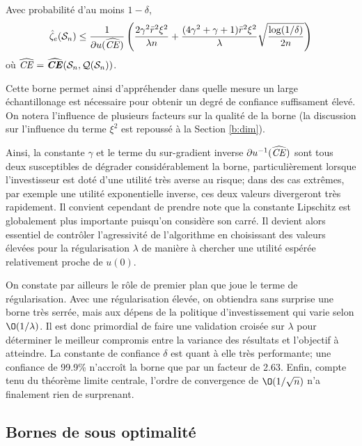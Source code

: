 \begin{thm}
  \label{thm2}
  Avec probabilité d'au moins $1-\delta$,
  \begin{equation}
    \hat\zeta_e(\mathcal S_n) \leq \frac{1}{\partial u(\operatorname{\widehat{\operatorname{\mbox{\textit{CE}}}}})}\left( \frac{2\gamma^2\bar r^2\xi^2}{\lambda n} + \frac{(4\gamma^2 + \gamma +
        1)\bar r^2\xi^2}{\lambda}\sqrt{\frac{\log(1/\delta)}{2n}}\right) 
  \end{equation}
  où $\operatorname{\widehat{\operatorname{\mbox{\textit{CE}}}}} = \operatorname{\widehat{\operatorname{\mbox{\textbf{\textit{CE}}}}}}(\mathcal S_n,\mathcal{Q}(\mathcal S_n))$. 
\end{thm}

Cette borne permet ainsi d'appréhender dans quelle mesure un large échantillonage est
nécessaire pour obtenir un degré de confiance suffisament élevé. On notera l'influence de
plusieurs facteurs sur la qualité de la borne (la discussion sur l'influence du terme
$\xi^2$ est repoussé à la Section \ref{b:dim}).

Ainsi, la constante $\gamma$ et le terme du sur-gradient inverse $\partial u^{-1}(\operatorname{\widehat{\operatorname{\mbox{\textit{CE}}}}})$ sont tous
deux susceptibles de dégrader considérablement la borne, particulièrement lorsque
l'investisseur est doté d'une utilité très averse au risque; dans des cas extrêmes, par
exemple une utilité exponentielle inverse, ces deux valeurs divergeront très
rapidement. Il convient cependant de prendre note que la constante Lipschitz est
globalement plus importante puisqu'on considère son carré. Il devient alors essentiel de
contrôler l'agressivité de l'algorithme en choisissant des valeurs élevées pour la
régularisation $\lambda$ de manière à chercher une utilité espérée relativement proche de
$u(0)$.

On constate par ailleurs le rôle de premier plan que joue le terme de régularisation. Avec
une régularisation élevée, on obtiendra sans surprise une borne très serrée, mais aux
dépens de la politique d'investissement qui varie selon $\O(1/\lambda)$. Il est donc primordial
de faire une validation croisée sur $\lambda$ pour déterminer le meilleur compromis entre la
variance des résultats et l'objectif à atteindre. La constante de confiance $\delta$ est quant
à elle très performante; une confiance de \num{99.9}\% n'accroît la borne que par un
facteur de \num{2.63}. Enfin, compte tenu du théorème limite centrale, l'ordre de
convergence de $\O(1/\sqrt{n})$ n'a finalement rien de surprenant.




\subsection{Bornes de sous optimalité}
\label{b:sopt}

